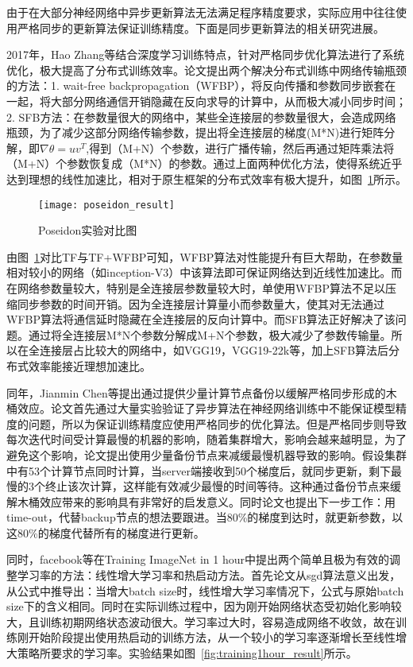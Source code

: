 由于在大部分神经网络中异步更新算法无法满足程序精度要求，实际应用中往往使用严格同步的更新算法保证训练精度。下面是同步更新算法的相关研究进展。

2017年，Hao Zhang等结合深度学习训练特点，针对严格同步优化算法进行了系统优化，极大提高了分布式训练效率。论文提出两个解决分布式训练中网络传输瓶颈的方法：1. wait-free backpropagation（WFBP），将反向传播和参数同步嵌套在一起，将大部分网络通信开销隐藏在反向求导的计算中，从而极大减小同步时间；2. SFB方法：在参数量很大的网络中，某些全连接层的参数量很大，会造成网络瓶颈，为了减少这部分网络传输参数，提出将全连接层的梯度(M*N)进行矩阵分解，即$\nabla\theta=uv^{T}$,得到（M+N）个参数，进行广播传输，然后再通过矩阵乘法将（M+N）个参数恢复成（M*N）的参数。通过上面两种优化方法，使得系统近乎达到理想的线性加速比，相对于原生框架的分布式效率有极大提升，如图~\ref{fig:poseidon_result}所示。

\begin{figure}[htp]
\centering
\texttt{[image: poseidon\_result]}
\caption{Poseidon实验对比图}
\label{fig:poseidon_result}
\end{figure}
由图~\ref{fig:poseidon_result}对比TF与TF+WFBP可知，WFBP算法对性能提升有巨大帮助，在参数量相对较小的网络（如inception-V3）中该算法即可保证网络达到近线性加速比。而在网络参数量较大，特别是全连接层参数量较大时，单使用WFBP算法不足以压缩同步参数的时间开销。因为全连接层计算量小而参数量大，使其对无法通过WFBP算法将通信延时隐藏在全连接层的反向计算中。而SFB算法正好解决了该问题。通过将全连接层M*N个参数分解成M+N个参数，极大减少了参数传输量。所以在全连接层占比较大的网络中，如VGG19，VGG19-22k等，加上SFB算法后分布式效率能接近理想加速比。

同年，Jianmin Chen等提出通过提供少量计算节点备份以缓解严格同步形成的木桶效应。论文首先通过大量实验验证了异步算法在神经网络训练中不能保证模型精度的问题，所以为保证训练精度应使用严格同步的优化算法。但是严格同步则导致每次迭代时间受计算最慢的机器的影响，随着集群增大，影响会越来越明显，为了避免这个影响，论文提出使用少量备份节点来减缓最慢机器导致的影响。假设集群中有53个计算节点同时计算，当server端接收到50个梯度后，就同步更新，剩下最慢的3个终止该次计算，这样能有效减少最慢的时间等待。这种通过备份节点来缓解木桶效应带来的影响具有非常好的启发意义。同时论文也提出下一步工作：用time-out，代替backup节点的想法要跟进。当80\%的梯度到达时，就更新参数，以这80\%的梯度代替所有的梯度进行更新。

同时，facebook等在Training ImageNet in 1 hour中提出两个简单且极为有效的调整学习率的方法：线性增大学习率和热启动方法。首先论文从sgd算法意义出发，从公式中推导出：当增大batch size时，线性增大学习率情况下，公式与原始batch size下的含义相同。同时在实际训练过程中，因为刚开始网络状态受初始化影响较大，且训练初期网络状态波动很大。学习率过大时，容易造成网络不收敛，故在训练刚开始阶段提出使用热启动的训练方法，从一个较小的学习率逐渐增长至线性增大策略所要求的学习率。实验结果如图~\ref{fig:training1hour_result}所示。

